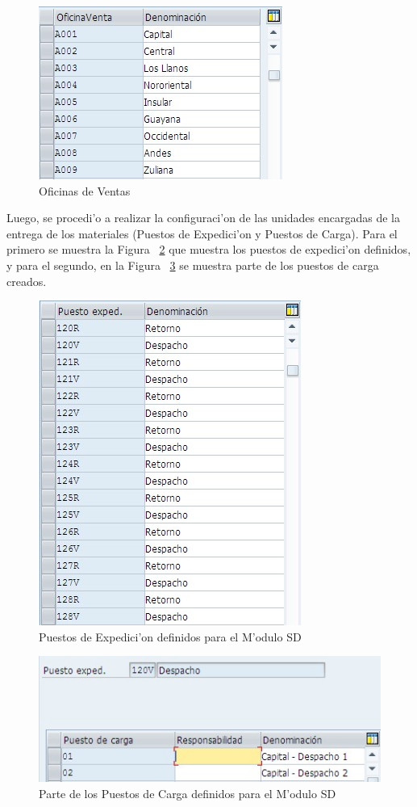 \begin{figure}[H]
\centering
\includegraphics[scale=0.65,type=jpg,ext=.jpg,read=.jpg]{figures/OfVenta}
\caption{Oficinas de Ventas}
\label{fig:oficinas}
\end{figure}

	Luego, se procedi'o a realizar la configuraci'on de las unidades encargadas de la entrega de los materiales (Puestos de Expedici'on y Puestos de Carga). Para el primero se muestra la Figura ~\ref{fig:expedicion} que muestra los puestos de expedici'on definidos, y para el segundo, en la Figura ~\ref{fig:carga} se muestra parte de los puestos de carga creados.
\begin{figure}[H]
\centering
\includegraphics[scale=0.65,type=jpg,ext=.jpg,read=.jpg]{figures/PuestosExpedicion}
\caption{ Puestos de Expedici'on definidos para el M'odulo SD}
\label{fig:expedicion}
\end{figure}
\begin{figure}[H]
\centering
\includegraphics[scale=0.65,type=jpg,ext=.jpg,read=.jpg]{figures/PuestoCarga}
\caption{Parte de los Puestos de Carga definidos para el M'odulo SD}
\label{fig:carga}
\end{figure}
